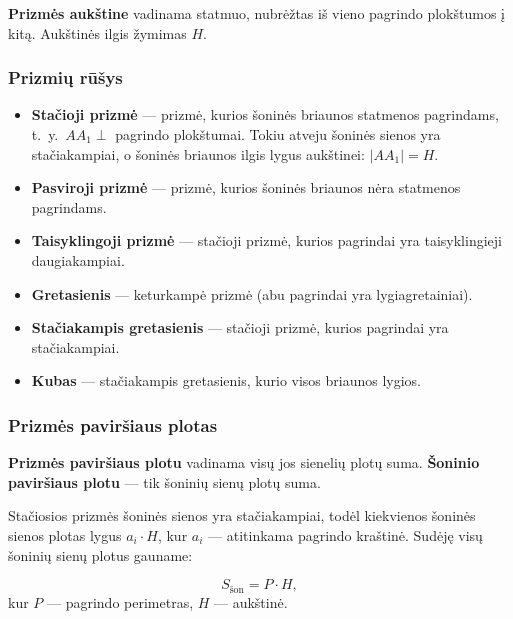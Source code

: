 \begin{definition}
\textbf{Prizmės aukštine} vadinama statmuo, nubrėžtas iš vieno pagrindo plokštumos į kitą. Aukštinės ilgis žymimas $H$.
\end{definition}

\subsubsection*{Prizmių rūšys}

\begin{itemize}
    \item \textbf{Stačioji prizmė} --- prizmė, kurios šoninės briaunos statmenos pagrindams, t.~y.\ $AA_1 \perp$ pagrindo plokštumai. Tokiu atveju šoninės sienos yra stačiakampiai, o šoninės briaunos ilgis lygus aukštinei: $|AA_1| = H$.
    \item \textbf{Pasviroji prizmė} --- prizmė, kurios šoninės briaunos nėra statmenos pagrindams.
    \item \textbf{Taisyklingoji prizmė} --- stačioji prizmė, kurios pagrindai yra taisyklingieji daugiakampiai.
    \item \textbf{Gretasienis} --- keturkampė prizmė (abu pagrindai yra lygiagretainiai).
    \item \textbf{Stačiakampis gretasienis} --- stačioji prizmė, kurios pagrindai yra stačiakampiai.
    \item \textbf{Kubas} --- stačiakampis gretasienis, kurio visos briaunos lygios.
\end{itemize}

\subsubsection*{Prizmės paviršiaus plotas}

\begin{definition}
\textbf{Prizmės paviršiaus plotu} vadinama visų jos sienelių plotų suma. \textbf{Šoninio paviršiaus plotu} --- tik šoninių sienų plotų suma.
\end{definition}

Stačiosios prizmės šoninės sienos yra stačiakampiai, todėl kiekvienos šoninės sienos plotas lygus $a_i \cdot H$, kur $a_i$ --- atitinkama pagrindo kraštinė. Sudėję visų šoninių sienų plotus gauname:

\begin{tcolorbox}[colback=blue!5!white, colframe=blue!50!black, title=Stačiosios prizmės šoninis paviršiaus plotas]
\[
    S_{\text{šon}} = P \cdot H,
\]
kur $P$ --- pagrindo perimetras, $H$ --- aukštinė.
\end{tcolorbox}

